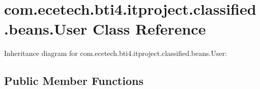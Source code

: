 \hypertarget{classcom_1_1ecetech_1_1bti4_1_1itproject_1_1classified_1_1beans_1_1_user}{}\section{com.\+ecetech.\+bti4.\+itproject.\+classified.\+beans.\+User Class Reference}
\label{classcom_1_1ecetech_1_1bti4_1_1itproject_1_1classified_1_1beans_1_1_user}


Inheritance diagram for com.\+ecetech.\+bti4.\+itproject.\+classified.\+beans.\+User\+:
\subsection*{Public Member Functions}
